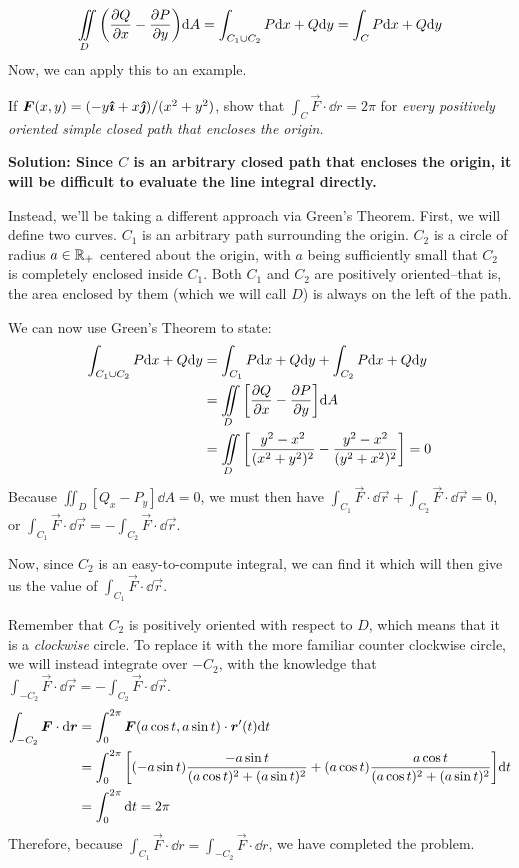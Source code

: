 \[ \iint\limits_D \pqty{\pdv{Q}{x} - \pdv{P}{y}}\dd A = \int_{C_1\cup C_2}P\dd x + Q\dd y = \int_C P\dd x + Q\dd y\]
Now, we can apply this to an example.
\begin{example}
    If $\boldsymbol{F}(x,y) = (-y\boldsymbol{\hat{\imath}} + x\boldsymbol{\hat{\jmath}})/(x^2+y^2)$, show that $\int_C \vec F\cdot\dd r = 2\pi$ for \it{every} positively oriented simple closed path that encloses the origin.\par
    \bf{Solution:} Since $C$ is an arbitrary closed path that encloses the origin, it will be difficult to evaluate the line integral directly. \par
    Instead, we'll be taking a different approach via Green's Theorem. First, we will define two curves. $C_1$ is an arbitrary path surrounding the origin. $C_2$ is a circle of radius $a\in\mathbb{R}_+$ centered about the origin, with $a$ being sufficiently small that $C_2$ is completely enclosed inside $C_1$. Both $C_1$ and $C_2$ are positively oriented--that is, the area enclosed by them (which we will call $D$) is always on the left of the path. \par
    We can now use Green's Theorem to state:
    \begin{align*}
        \int_{C_1\cup C_2}P\dd x + Q\dd y &= \int_{C_1}P\dd x + Q\dd y + \int_{C_2}P\dd x + Q\dd y \\
        &= \iint\limits_{D}\bqty{\pdv{Q}{x}-\pdv{P}{y}}\dd A \\
        &= \iint\limits_D \bqty{\frac{y^2-x^2}{(x^2+y^2)^2}-\frac{y^2-x^2}{(y^2+x^2)^2}} = 0
    \end{align*}
    Because $\iint_D [Q_x-P_y]\dd A = 0$, we must then have $\int_{C_1} \vec F \cdot \dd \vec r + \int_{C_2}\vec F \cdot \dd \vec r = 0$, or $\int_{C_1}\vec F \cdot \dd \vec r = -\int_{C_2}\vec F \cdot \dd \vec r$. \par
    Now, since $C_2$ is an easy-to-compute integral, we can find it which will then give us the value of $\int_{C_1}\vec F \cdot \dd \vec r$. \par
    Remember that $C_2$ is positively oriented with respect to $D$, which means that it is a \textit{clockwise} circle. To replace it with the more familiar counter clockwise circle, we will instead integrate over $-C_2$, with the knowledge that $\int_{-C_2}\vec F \cdot \dd \vec r = -\int_{C_2}\vec F \cdot \dd \vec r$. 
    \begin{align*}
        \int_{-C_2}\vec F \cdot \dd \vec r &= \int_0^{2\pi} \vec F(a\cos t, a\sin t)\cdot \vec r'(t)\dd t \\
        &= \int_0^{2\pi}\bqty{(-a\sin t)\frac{-a\sin t}{(a\cos t)^2+(a\sin t)^2} + (a\cos t)\frac{a\cos t}{(a\cos t)^2+(a\sin t)^2}}\dd t \\
        &= \int_0^{2\pi}\dd t = 2\pi
    \end{align*}
    Therefore, because $\int_{C_1}\vec F \cdot \dd r = \int_{-C_2}\vec F \cdot \dd r$, we have completed the problem.
\end{example}
